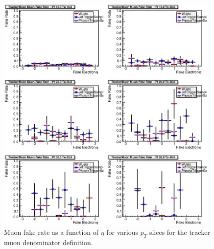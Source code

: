 \documentclass{cmspaper}
\begin{document}
\begin{figure}[htb]
\begin{center}
\includegraphics[width=0.98\textwidth]{plots/TrackerMuonFakeRatePtSlices.eps}
   \caption{Muon fake rate as a function of $\eta$ for various $p_T$ slices for the tracker muon denominator definition. }
   \label{fig:muonFR_trackermuon_ptslices}
\end{center}
\end{figure}
\end{document}

